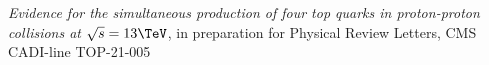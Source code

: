 \textit{Evidence for the simultaneous production of four top quarks in proton-proton collisions at $\sqrt{s} = 13\TeV$}, in preparation for Physical Review Letters, CMS CADI-line TOP-21-005
